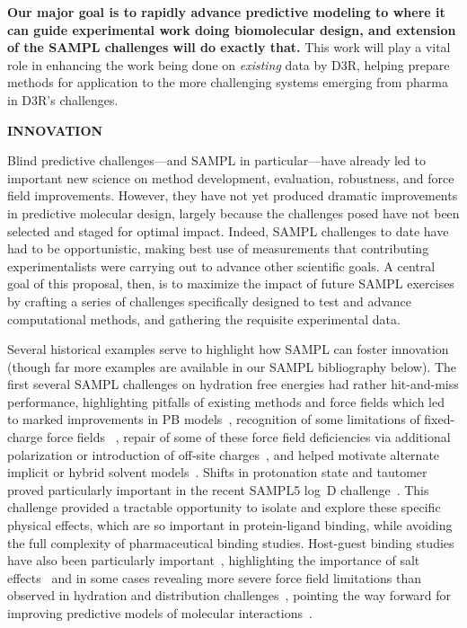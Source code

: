 \documentclass[11pt]{article}
\begin{document}
\textbf{Our major goal is to rapidly advance predictive modeling to where it can guide experimental work doing biomolecular design, and extension of the SAMPL challenges will do exactly that.} This work will play a vital role in enhancing the work being done on \emph{existing} data by D3R, helping prepare methods for application to the more challenging systems emerging from pharma in D3R's challenges. 

{\large \bf INNOVATION}

Blind predictive challenges---and SAMPL in particular---have already led to important new science on method development, evaluation, robustness, and force field improvements. 
However, they have not yet produced dramatic improvements in predictive molecular design, largely because the challenges posed have not been selected and staged for optimal impact. 
Indeed, SAMPL challenges to date have had to be opportunistic, making best use of measurements that contributing experimentalists were carrying out to advance other scientific goals. 
A central goal of this proposal, then, is to maximize the impact of future SAMPL exercises by crafting a series of challenges specifically designed to test and advance computational methods, and gathering the requisite experimental data. 

Several historical examples serve to highlight how SAMPL can foster innovation (though far more examples are available in our SAMPL bibliography below). 
The first several SAMPL challenges on hydration free energies had rather hit-and-miss performance, highlighting pitfalls of existing methods and force fields which led to marked improvements in PB models~\cite{nicholls_samp1_2009, ellingson_analysis_2010,ellingson_efficient_2014}, recognition of some limitations of fixed-charge force fields ~\cite{mobley_alchemical_2012, Fennell:2014:J.Phys.Chem.B},
repair of some of these force field deficiencies via additional polarization or introduction of off-site charges~\cite{mobley_alchemical_2012, Fennell:2014:J.Phys.Chem.B, paranahewage_predicting_2016},
and helped motivate alternate implicit or hybrid solvent models~\cite{sulea_predicting_2011, li_testing_2014, brini_adapting_2016}.
Shifts in protonation state and tautomer proved particularly important in the recent SAMPL5 log~D challenge~\cite{bannan_blind_2016, klamt_prediction_2016}.
This challenge provided a tractable opportunity to isolate and explore these specific physical effects, which are so important in protein-ligand binding, while avoiding the full complexity of pharmaceutical binding studies.
Host-guest binding studies have also been particularly important~\cite{mobley_predicting_2016},
highlighting the importance of salt effects~\cite{yin_overview_2016, muddana_blind_2014, mobley_predicting_2016}
and in some cases revealing more severe force field limitations than observed in hydration and distribution challenges~\cite{yin_sampl5_2016, muddana_sampl4_2014-1}, pointing the way forward for improving predictive models of molecular interactions~\cite{yin_toward_2015, mobley_predicting_2016}.
\end{document}
